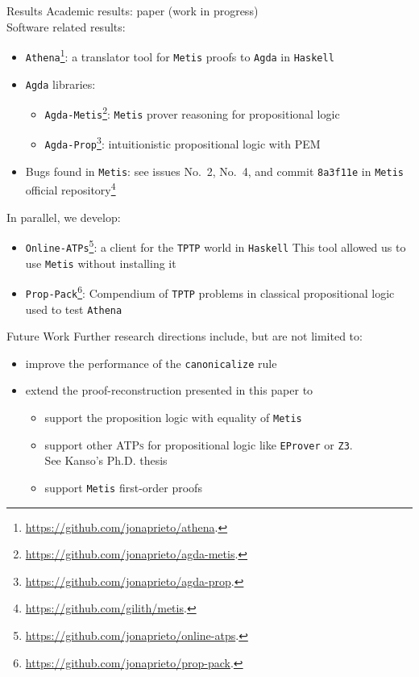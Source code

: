 \documentclass[10pt, xetex, hyperref={pdfpagelabels=false}]{beamer}
\newcommand{\abbre}[1]{\textsc{#1}\xspace}
\newcommand{\ATPs}{\abbre{ATPs}}
\newcommand{\name}[1]{\texttt{#1}\xspace}
\newcommand{\canonicalize}{\name{canonicalize}}
\newcommand{\prg}[1]{\texttt{#1}\xspace}
\newcommand{\Agda}{\prg{Agda}}
\newcommand{\Athena}{\prg{Athena}}
\newcommand{\Metis}{\prg{Metis}}
\newcommand{\len}[1]{\texttt{#1}\xspace}
\newcommand{\Haskell}{\len{Haskell}}
\newcommand{\TPTP}{\len{TPTP}}
\begin{document}
\begin{frame}[label=contributions]{Results}
Academic results: paper (work in progress)\\
Software related results:
\begin{itemize}
\item \Athena\footnote{\url{https://github.com/jonaprieto/athena}.}: a translator tool for \Metis proofs to \Agda in \Haskell
\item \Agda libraries:
\begin{itemize}
  \item \texttt{Agda-Metis}\footnote{\url{https://github.com/jonaprieto/agda-metis}.}: \Metis prover reasoning for propositional logic
  \item \texttt{Agda-Prop}\footnote{\url{https://github.com/jonaprieto/agda-prop}.}: intuitionistic propositional logic with PEM
\end{itemize}
\item Bugs found in \Metis: see issues No.~2, No.~4, and commit
\name{8a3f11e} in \Metis official
repository\footnote{\url{https://github.com/gilith/metis}.}
\end{itemize}

In parallel, we develop:
\begin{itemize}
\item \name{Online-ATPs}\footnote{\url{https://github.com/jonaprieto/online-atps}.}: a client for the \TPTP world in \Haskell
This tool allowed us to use \Metis without installing it
\item \name{Prop-Pack}\footnote{\url{https://github.com/jonaprieto/prop-pack}.}: Compendium of \TPTP problems in classical propositional logic used to test \Athena
\end{itemize}

\end{frame}

\begin{frame}[label=future-work]{Future Work}
Further research directions include, but are not limited to:

\begin{itemize}
\item improve the performance of the \canonicalize rule
\item extend the proof-reconstruction presented in this paper to
  \begin{itemize}
    \item support the proposition logic with equality of \Metis
    \item support other \ATPs for propositional logic like \name{EProver}
     or \name{Z3}.\\
     See Kanso's Ph.D. thesis~\cite{Kanso2012}
    \item support \Metis first-order proofs
  \end{itemize}
\end{itemize}

\end{frame}
\end{document}

